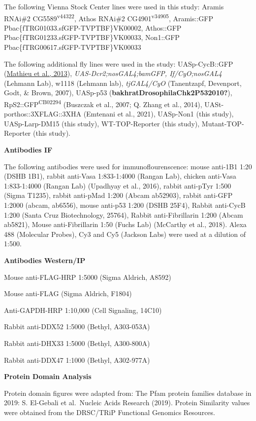 \documentclass[12pt,oneside]{reedthesis}
\begin{document}
The following Vienna Stock Center lines were used in this study: Aramis
RNAi\#2 CG5589\textsuperscript{v44322}, Athos RNAi\#2 CG4901\textsuperscript{v34905}, Aramis::GFP
Pbac\{fTRG01033.sfGFP-TVPTBF\}VK00002, Athos::GFP
Pbac\{fTRG01233.sfGFP-TVPTBF\}VK00033, Non1::GFP
Pbac\{fTRG00617.sfGFP-TVPTBF\}VK00033

The following additional fly lines were used in the study:
UASp-CycB::GFP (\href{https://www.ncbi.nlm.nih.gov/pmc/articles/PMC5830152/\#R25}{Mathieu et al.,
2013}),
\emph{UAS-Dcr2;nosGAL4;bamGFP, If/CyO;nosGAL4} (Lehmann Lab), w1118 (Lehmann
lab),
\emph{tjGAL4/CyO} (Tanentzapf, Devenport, Godt, \& Brown, 2007),
UASp-p53 (\textbf{bakhratDrosophilaChk2P532010?}), RpS2::GFP\textsuperscript{CB02294}
(Buszczak et al., 2007; Q. Zhang et al., 2014),
UASt-porthos::3XFLAG::3XHA (Emtenani et al., 2021),
UASp-Non1 (this study), UASp-Larp-DM15 (this study), WT-TOP-Reporter
(this study), Mutant-TOP-Reporter (this study).

\textbf{Antibodies IF}

The following antibodies were used for immunoflourenscence: mouse
anti-1B1 1:20 (DSHB 1B1), rabbit anti-Vasa 1:833-1:4000 (Rangan Lab),
chicken anti-Vasa 1:833-1:4000 (Rangan Lab)
(Upadhyay et al., 2016), rabbit anti-pTyr
1:500 (Sigma T1235), rabbit anti-pMad 1:200 (Abcam ab52903), rabbit
anti-GFP 1:2000 (abcam, ab6556), mouse anti-p53 1:200 (DSHB 25F4),
Rabbit anti-CycB 1:200 (Santa Cruz Biotechnology, 25764), Rabbit
anti-Fibrillarin 1:200 (Abcam ab5821), Mouse anti-Fibrillarin 1:50
(Fuchs Lab) (McCarthy et al., 2018). Alexa 488 (Molecular Probes), Cy3 and
Cy5 (Jackson Labs) were used at a dilution of 1:500.

\textbf{Antibodies Western/IP}

Mouse anti-FLAG-HRP 1:5000 (Sigma Aldrich, A8592)

Mouse anti-FLAG (Sigma Aldrich, F1804)

Anti-GAPDH-HRP 1:10,000 (Cell Signaling, 14C10)

Rabbit anti-DDX52 1:5000 (Bethyl, A303-053A)

Rabbit anti-DHX33 1:5000 (Bethyl, A300-800A)

Rabbit anti-DDX47 1:1000 (Bethyl, A302-977A)

\textbf{Protein Domain Analysis}

Protein domain figures were adapted from: The Pfam protein families
database in 2019: S. El-Gebali et al.~Nucleic Acids Research (2019).
Protein Similarity values were obtained from the DRSC/TRiP Functional
Genomics Resources.
\end{document}
